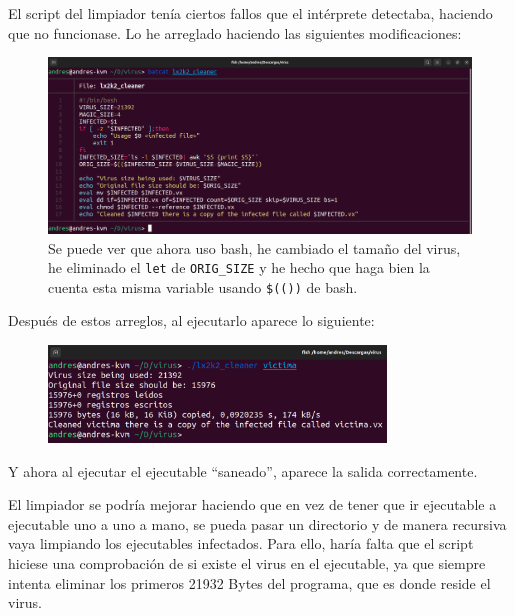\documentclass{article}
\begin{document}
\bigskip

El script del limpiador tenía ciertos fallos que el intérprete detectaba, haciendo que no funcionase. Lo he arreglado haciendo las siguientes modificaciones: 

\begin{figure}[H]
    \includegraphics[width=\textwidth]{imagenes/Captura desde 2022-11-23 12-44-29.png}
    \caption{Se puede ver que ahora uso bash, he cambiado el tamaño del virus, he eliminado el \texttt{let} de \texttt{ORIG\_SIZE} y he hecho que haga bien la cuenta esta misma variable usando \texttt{\$(())} de bash.}
\end{figure}

\newpage

Después de estos arreglos, al ejecutarlo aparece lo siguiente:

\begin{figure}[H]
    \centering
    \includegraphics[width=0.8\textwidth]{imagenes/Captura desde 2022-11-23 12-45-50.png}
\end{figure}

\bigskip

Y ahora al ejecutar el ejecutable ``saneado'', aparece la salida correctamente.

\bigskip

El limpiador se podría mejorar haciendo que en vez de tener que ir ejecutable a ejecutable uno a uno a mano, se pueda pasar un directorio y de manera recursiva vaya limpiando los ejecutables infectados. Para ello, haría falta que el script hiciese una comprobación de si existe el virus en el ejecutable, ya que siempre intenta eliminar los primeros 21932 Bytes del programa, que es donde reside el virus.
\end{document}
